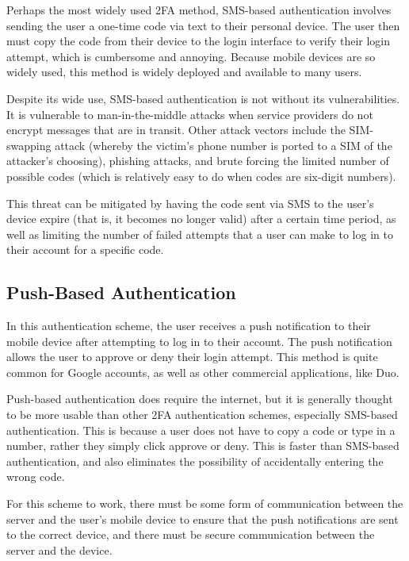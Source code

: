 \documentclass[11pt]{article}
\begin{document}
Perhaps the most widely used 2FA method, SMS-based authentication
involves sending the user a one-time code via text to their personal
device. The user then must copy the code from their device to the login
interface to verify their login attempt, which is cumbersome and
annoying. Because mobile devices are so widely used, this method is
widely deployed and available to many users. 

Despite its wide use, SMS-based authentication is not without its
vulnerabilities. It is vulnerable to man-in-the-middle attacks when
service providers do not encrypt messages that are in transit. Other
attack vectors include the SIM-swapping attack (whereby the victim's
phone number is ported to a SIM of the attacker's choosing), phishing
attacks, and brute forcing the limited number of possible codes (which
is relatively easy to do when codes are six-digit numbers). 

This threat can be mitigated by having the code sent via SMS to the
user's device expire (that is, it becomes no longer valid) after a
certain time period, as well as limiting the number of failed attempts
that a user can make to log in to their account for a specific code. 

\subsection{Push-Based Authentication}

In this authentication scheme, the user receives a push notification to
their mobile device after attempting to log in to their account. The
push notification allows the user to approve or deny their login
attempt. This method is quite common for Google accounts, as well as
other commercial applications, like Duo. 

Push-based authentication does require the internet, but it is generally
thought to be more usable than other 2FA authentication schemes,
especially SMS-based authentication. This is because a user does not
have to copy a code or type in a number, rather they simply click
approve or deny. This is faster than SMS-based authentication, and also
eliminates the possibility of accidentally entering the wrong code. 

For this scheme to work, there must be some form of communication
between the server and the user's mobile device to ensure that the push
notifications are sent to the correct device, and there must be secure
communication between the server and the device. 
\end{document}

